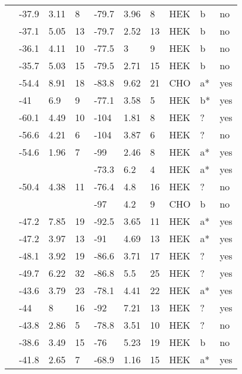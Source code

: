 \begin{longtable}{p{5cm}|lll|lll|lll}
\citet{Kapplinger2015MutationDB} & -37.9 & 3.11 & 8 & -79.7 & 3.96 & 8 & HEK & b & no \\
\citet{Kapplinger2015MutationDB} & -37.1 & 5.05 & 13 & -79.7 & 2.52 & 13 & HEK & b & no \\
\citet{Kapplinger2015MutationDB} & -36.1 & 4.11 & 10 & -77.5 & 3 & 9 & HEK & b & no \\
\citet{Kapplinger2015MutationDB} & -35.7 & 5.03 & 15 & -79.5 & 2.71 & 15 & HEK & b & no \\
\citet{Kato2014MutationDB} & -54.4 & 8.91 & 18 & -83.8 & 9.62 & 21 & CHO & a* & yes \\
\citet{Keller2005MutationDB} & -41 & 6.9 & 9 & -77.1 & 3.58 & 5 & HEK & b* & yes \\
\citet{Keller2006MutationDB} & -60.1 & 4.49 & 10 & -104 & 1.81 & 8 & HEK & ? & yes \\
\citet{Li2009MutationDB} & -56.6 & 4.21 & 6 & -104 & 3.87 & 6 & HEK & ? & no \\
\citet{Lin2008MutationDB} & -54.6 & 1.96 & 7 & -99 & 2.46 & 8 & HEK & a* & yes \\
\citet{Liu2002MutationDB} & && & -73.3 & 6.2 & 4 & HEK & a* & yes \\
\citet{Liu2003aMutationDB} & -50.4 & 4.38 & 11 & -76.4 & 4.8 & 16 & HEK & ? & no \\
\citet{Liu2005MutationDB} & && & -97 & 4.2 & 9 & CHO & b & no \\
\citet{Lupoglazoff2001MutationDB} & -47.2 & 7.85 & 19 & -92.5 & 3.65 & 11 & HEK & a* & yes \\
\citet{Makita2002MutationDB} & -47.2 & 3.97 & 13 & -91 & 4.69 & 13 & HEK & a* & yes \\
\citet{Makita2005MutationDB} & -48.1 & 3.92 & 19 & -86.6 & 3.71 & 17 & HEK & ? & yes \\
\citet{Makita2008MutationDB} & -49.7 & 6.22 & 32 & -86.8 & 5.5 & 25 & HEK & ? & yes \\
\citet{Makiyama2008MutationDB} & -43.6 & 3.79 & 23 & -78.1 & 4.41 & 22 & HEK & a* & yes \\
\citet{Marangoni2011MutationDB} & -44 & 8 & 16 & -92 & 7.21 & 13 & HEK & ? & yes \\
\citet{MedeirosDomingo2007MutationDB} & -43.8 & 2.86 & 5 & -78.8 & 3.51 & 10 & HEK & ? & no \\
\citet{MedeirosDomingo2009MutationDB} & -38.6 & 3.49 & 15 & -76 & 5.23 & 19 & HEK & b & no \\
\citet{Mohler2004MutationDB} & -41.8 & 2.65 & 7 & -68.9 & 1.16 & 15 & HEK & a* & yes \\

\end{longtable}
